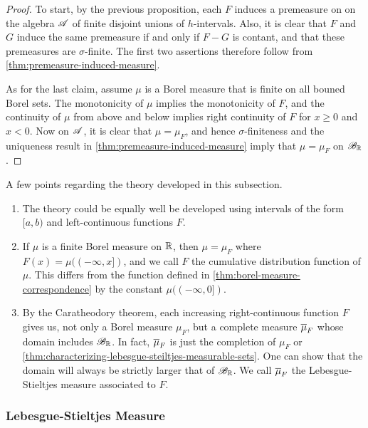 \documentclass[12pt]{article} %
\begin{document}
\begin{proof}
    To start, by the previous proposition, each $F$ induces a premeasure on on the algebra $\mathscr{A}$ of finite disjoint unions of $h$-intervals. Also, it is clear that $F$ and $G$ induce the same premeasure if and only if $F - G$ is contant, and that these premeasures are $\sigma$-finite. The first two assertions therefore follow from \cref{thm:premeasure-induced-measure}.

    As for the last claim, assume $\mu$ is a Borel measure that is finite on all bouned Borel sets. The monotonicity of $\mu$ implies the monotonicity of $F$, and the continuity of $\mu$ from above and below implies right continuity of $F$ for $x \geq 0$ and $x < 0$. Now on $\mathscr{A}$, it is clear that $\mu = \mu_F$, and hence $\sigma$-finiteness and the uniqueness result in \cref{thm:premeasure-induced-measure} imply that $\mu = \mu_F$ on $\mathscr{B}_{\mathbb{R}}$.
\end{proof}

\begin{remark}
    A few points regarding the theory developed in this subsection.
    \begin{enumerate}
        \item The theory could be equally well be developed using intervals of the form $[a, b)$ and left-continuous functions $F$.
        \item If $\mu$ is a finite Borel measure on $\mathbb{R}$, then $\mu = \mu_F$ where $F(x) = \mu((-\infty, x])$, and we call $F$ the cumulative distribution function of $\mu$. This differs from the function defined in \cref{thm:borel-measure-correspondence} by the constant $\mu((-\infty, 0])$.
        \item By the Caratheodory theorem, each increasing right-continuous function $F$ gives us, not only a Borel measure $\mu_F$, but a complete measure $\overline{\mu}_F$ whose domain includes $\mathscr{B}_{\mathbb{R}}$. In fact, $\overline{\mu}_F$ is just the completion of $\mu_F$ \citep[Exercise~22a]{folland1999real} or \cref{thm:characterizing-lebesgue-steiltjes-measurable-sets}. One can show that the domain will always be strictly larger that of $\mathscr{B}_{\mathbb{R}}$. We call $\overline{\mu}_F$ the Lebesgue-Stieltjes measure associated to $F$.
    \end{enumerate}
\end{remark}

\subsubsection{Lebesgue-Stieltjes Measure}
\end{document}

